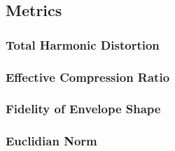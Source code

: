 \documentclass[../main2.tex]{subfiles}
\begin{document}
\subsection{Metrics}

\subsubsection{Total Harmonic Distortion}

\subsubsection{Effective Compression Ratio}

\subsubsection{Fidelity of Envelope Shape}

\subsubsection{Euclidian Norm}
\end{document}
